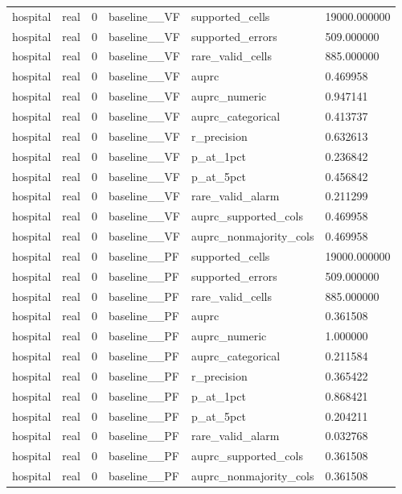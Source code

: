 \begin{tabular}{llllll}
hospital & real & 0 & baseline\_\_VF & supported\_cells & 19000.000000 \\
hospital & real & 0 & baseline\_\_VF & supported\_errors & 509.000000 \\
hospital & real & 0 & baseline\_\_VF & rare\_valid\_cells & 885.000000 \\
hospital & real & 0 & baseline\_\_VF & auprc & 0.469958 \\
hospital & real & 0 & baseline\_\_VF & auprc\_numeric & 0.947141 \\
hospital & real & 0 & baseline\_\_VF & auprc\_categorical & 0.413737 \\
hospital & real & 0 & baseline\_\_VF & r\_precision & 0.632613 \\
hospital & real & 0 & baseline\_\_VF & p\_at\_1pct & 0.236842 \\
hospital & real & 0 & baseline\_\_VF & p\_at\_5pct & 0.456842 \\
hospital & real & 0 & baseline\_\_VF & rare\_valid\_alarm & 0.211299 \\
hospital & real & 0 & baseline\_\_VF & auprc\_supported\_cols & 0.469958 \\
hospital & real & 0 & baseline\_\_VF & auprc\_nonmajority\_cols & 0.469958 \\
hospital & real & 0 & baseline\_\_PF & supported\_cells & 19000.000000 \\
hospital & real & 0 & baseline\_\_PF & supported\_errors & 509.000000 \\
hospital & real & 0 & baseline\_\_PF & rare\_valid\_cells & 885.000000 \\
hospital & real & 0 & baseline\_\_PF & auprc & 0.361508 \\
hospital & real & 0 & baseline\_\_PF & auprc\_numeric & 1.000000 \\
hospital & real & 0 & baseline\_\_PF & auprc\_categorical & 0.211584 \\
hospital & real & 0 & baseline\_\_PF & r\_precision & 0.365422 \\
hospital & real & 0 & baseline\_\_PF & p\_at\_1pct & 0.868421 \\
hospital & real & 0 & baseline\_\_PF & p\_at\_5pct & 0.204211 \\
hospital & real & 0 & baseline\_\_PF & rare\_valid\_alarm & 0.032768 \\
hospital & real & 0 & baseline\_\_PF & auprc\_supported\_cols & 0.361508 \\
hospital & real & 0 & baseline\_\_PF & auprc\_nonmajority\_cols & 0.361508 \\

\end{tabular}
